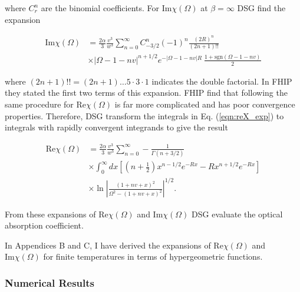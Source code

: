 where $C^n_r$ are the binomial coefficients. For $\text{Im}\chi(\Omega)$ at $\beta = \infty$ DSG find the expansion

\begin{equation}
    \begin{split}
        \textrm{Im}\chi(\Omega) &= \frac{2\alpha}{3} \frac{v^3}{w^3} \sum_{n=0}^\infty C^n_{-3/2} (-1)^n \frac{(2R)^n}{(2n + 1)!!} \\
        &\times |\Omega -1 - nv|^{n + 1/2} e^{-|\Omega - 1 -nv|R}\ \frac{1 + \textrm{sgn}(\Omega - 1 - nv)}{2}
    \end{split}
\end{equation}

where $(2n + 1)!! = (2n + 1) \dots 5 \cdot 3 \cdot 1$ indicates the double factorial. In FHIP they stated the first two terms of this expansion. FHIP find that following the same procedure for $\text{Re}\chi(\Omega)$ is far more complicated and has poor convergence properties. Therefore, DSG transform the integrals in Eq. (\ref{eqn:reX_exp}) to integrals with rapidly convergent integrands to give the result

\begin{equation}
    \begin{split}
    \textrm{Re}\chi(\Omega) &= \frac{2\alpha}{3} \frac{v^3}{w^3} \sum_{n=0}^\infty -\frac{1}{\Gamma(n + 3/2)} \\
    &\times\int_0^\infty dx \left[ \left(n + \frac{1}{2}\right) x^{n-1/2} e^{-Rx} - R x^{n + 1/2} e^{-Rx} \right] \\
    &\times \ln{\left| \frac{(1 + nv + x)^2}{\Omega^2 - (1 + nv + x)^2} \right|^{1/2}}.
    \end{split}
\end{equation}

From these expansions of $\text{Re}\chi(\Omega)$ and $\text{Im}\chi(\Omega)$ DSG evaluate the optical absorption coefficient. 

In Appendices B and C, I have derived the expansions of $\text{Re}\chi(\Omega)$ and $\text{Im}\chi(\Omega)$ for finite temperatures in terms of hypergeometric functions.

\subsubsection{Numerical Results}

